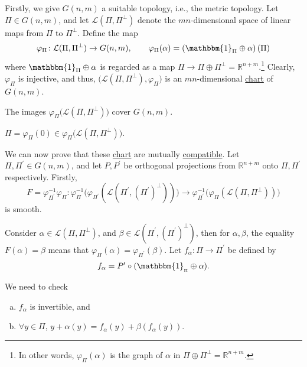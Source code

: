 Firstly, we give \(G(n, m)\) a suitable topology, i.e., the metric topology. Let \(\Pi \in G(n, m)\), and let \(\mathcal{L} (\Pi , \Pi ^{\perp})\) denote the \(mn\)-dimensional space of linear maps from \(\Pi\) to \(\Pi ^{\perp} \). Define the map
\[
	\varphi _\Pi \colon \mathcal{L} (\Pi , \Pi ^{\perp} ) \to G(n, m),\qquad
	\varphi _\Pi (\alpha ) = \left( \mathbbm{1}_{\Pi } \oplus \alpha  \right) (\Pi )
\]
where \(\mathbbm{1}_{\Pi }\oplus \alpha  \) is regarded as a map \(\Pi \to \Pi \oplus \Pi ^{\perp} = \mathbb{R} ^{n+m}\).\footnote{In other words, \(\varphi _\Pi (\alpha )\) is the graph of \(\alpha \) in \(\Pi \oplus \Pi ^{\perp} = \mathbb{R} ^{n+m}\).} Clearly, \(\varphi _\Pi \) is injective, and thus, \(\big(\mathcal{L} (\Pi , \Pi ^{\perp} ), \varphi _\Pi \big)\) is an \(mn\)-dimensional \hyperref[def:coordinate-chart]{chart} of \(G(n, m)\).

\begin{remark}
	The images \(\varphi _\Pi \big(\mathcal{L} (\Pi , \Pi ^{\perp} )\big)\) cover \(G(n, m)\).
\end{remark}

\begin{eg}
	\(\Pi = \varphi _\Pi (0)\in \varphi _\Pi \big(\mathcal{L} (\Pi , \Pi ^{\perp} )\big)\).
\end{eg}

We can now prove that these \hyperref[def:coordinate-chart]{chart} are mutually \hyperref[not:smoothly-compatible]{compatible}. Let \(\Pi , \Pi ^\prime \in G(n, m)\), and let \(P, P^\prime \) be orthogonal projections from \(\mathbb{R} ^{n+m}\) onto \(\Pi , \Pi ^\prime \) respectively. Firstly,
\[
	F = \varphi _{\Pi ^\prime }^{-1} \varphi _\Pi \colon \varphi _\Pi ^{-1} \big(\varphi _{\Pi ^\prime }(\mathcal{L} (\Pi ^\prime , (\Pi ^\prime )^{\perp} ))\big) \to  \varphi _{\Pi ^\prime }^{-1} \big(\varphi _\Pi (\mathcal{L} (\Pi , \Pi ^{\perp} ))\big)
\]
is smooth.

\begin{center}
\end{center}

Consider \(\alpha \in \mathcal{L} (\Pi ,\Pi ^{\perp} )\), and \(\beta \in \mathcal{L} (\Pi ^\prime , (\Pi ^\prime )^{\perp} )\), then for \(\alpha , \beta \), the equality \(F(\alpha ) = \beta\) means that \(\varphi _\Pi (\alpha ) = \varphi _{\Pi ^\prime }(\beta )\). Let \(f_\alpha \colon \Pi \to \Pi ^\prime \) be defined by
\[
	f_\alpha = P^\prime \circ (\mathbbm{1}_{_\Pi }\oplus \alpha ).
\]

We need to check
\begin{enumerate}[(a)]
	\item \(f_\alpha \) is invertible, and
	\item \(\forall y\in \Pi \), \(y+\alpha (y) = f_\alpha (y) + \beta (f_\alpha (y))\).
\end{enumerate}

